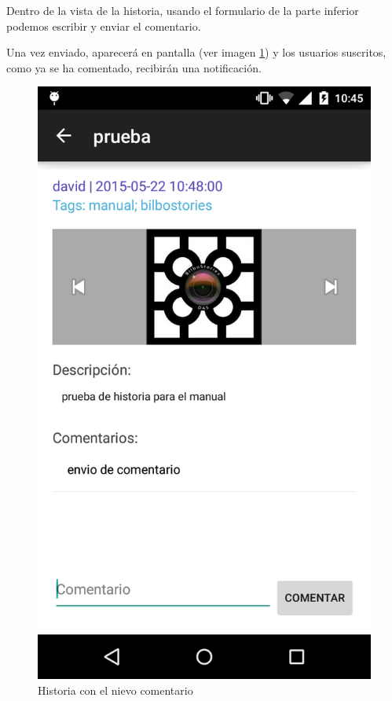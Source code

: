\documentclass[11pt,a4paper, titlepage]{article}
\begin{document}
	Dentro de la vista de la historia, usando el formulario de la parte inferior podemos escribir y enviar el comentario.
	
	Una vez enviado, aparecerá en pantalla (ver imagen \ref{p23}) y los usuarios suscritos, como ya se ha comentado, recibirán una notificación.
	
	\begin{figure}[hbtp]
		\centering
		\includegraphics[scale = 0.25 ]{img/17}
		\caption{Historia con el nievo comentario}
		\label{p23}
	\end{figure}
	
	
	
\end{document}
